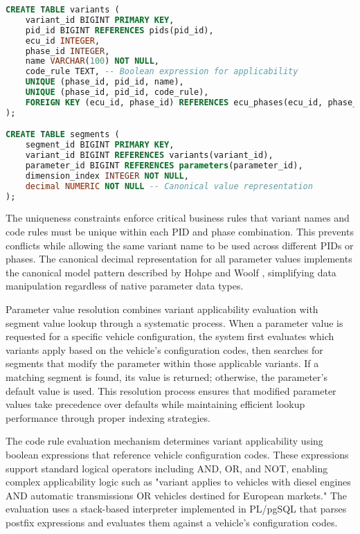 \begin{lstlisting}[language=SQL, caption={Variant and Segment Management}, label={lst:variant-segment}]
CREATE TABLE variants (
    variant_id BIGINT PRIMARY KEY,
    pid_id BIGINT REFERENCES pids(pid_id),
    ecu_id INTEGER,
    phase_id INTEGER,
    name VARCHAR(100) NOT NULL,
    code_rule TEXT, -- Boolean expression for applicability
    UNIQUE (phase_id, pid_id, name),
    UNIQUE (phase_id, pid_id, code_rule),
    FOREIGN KEY (ecu_id, phase_id) REFERENCES ecu_phases(ecu_id, phase_id)
);

CREATE TABLE segments (
    segment_id BIGINT PRIMARY KEY,
    variant_id BIGINT REFERENCES variants(variant_id),
    parameter_id BIGINT REFERENCES parameters(parameter_id),
    dimension_index INTEGER NOT NULL,
    decimal NUMERIC NOT NULL -- Canonical value representation
);
\end{lstlisting}

The uniqueness constraints enforce critical business rules that variant names and code rules must be unique within each PID and phase combination. This prevents conflicts while allowing the same variant name to be used across different PIDs or phases. The canonical decimal representation for all parameter values implements the canonical model pattern described by Hohpe and Woolf \cite{hohpe2002enterprise}, simplifying data manipulation regardless of native parameter data types.

Parameter value resolution combines variant applicability evaluation with segment value lookup through a systematic process. When a parameter value is requested for a specific vehicle configuration, the system first evaluates which variants apply based on the vehicle's configuration codes, then searches for segments that modify the parameter within those applicable variants. If a matching segment is found, its value is returned; otherwise, the parameter's default value is used. This resolution process ensures that modified parameter values take precedence over defaults while maintaining efficient lookup performance through proper indexing strategies.

The code rule evaluation mechanism determines variant applicability using boolean expressions that reference vehicle configuration codes. These expressions support standard logical operators including AND, OR, and NOT, enabling complex applicability logic such as "variant applies to vehicles with diesel engines AND automatic transmissions OR vehicles destined for European markets." The evaluation uses a stack-based interpreter implemented in PL/pgSQL that parses postfix expressions and evaluates them against a vehicle's configuration codes.

